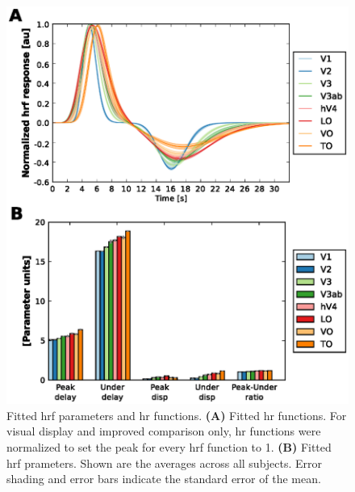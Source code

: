 \begin{figure}[htbp!]
\centering
\includegraphics[width=\textwidth]{figures/chapter_04_SI/figF.eps}
\caption{Fitted hrf parameters and hr functions. \textbf{(A)} Fitted hr functions. For visual display and improved comparison only, hr functions were normalized to set the peak for every hrf function to 1. \textbf{(B)} Fitted hrf prameters. Shown are the averages across all subjects. Error shading and error bars indicate the standard error of the mean.}
\label{fig:hrf}
\end{figure}

